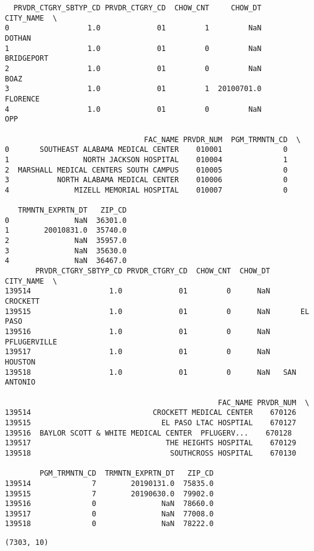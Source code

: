 \documentclass[
  letterpaper,
  DIV=11,
  numbers=noendperiod]{scrartcl}
\begin{document}
\begin{verbatim}
  PRVDR_CTGRY_SBTYP_CD PRVDR_CTGRY_CD  CHOW_CNT     CHOW_DT   CITY_NAME  \
0                  1.0             01         1         NaN      DOTHAN   
1                  1.0             01         0         NaN  BRIDGEPORT   
2                  1.0             01         0         NaN        BOAZ   
3                  1.0             01         1  20100701.0    FLORENCE   
4                  1.0             01         0         NaN         OPP   

                                FAC_NAME PRVDR_NUM  PGM_TRMNTN_CD  \
0       SOUTHEAST ALABAMA MEDICAL CENTER    010001              0   
1                 NORTH JACKSON HOSPITAL    010004              1   
2  MARSHALL MEDICAL CENTERS SOUTH CAMPUS    010005              0   
3           NORTH ALABAMA MEDICAL CENTER    010006              0   
4               MIZELL MEMORIAL HOSPITAL    010007              0   

   TRMNTN_EXPRTN_DT   ZIP_CD  
0               NaN  36301.0  
1        20010831.0  35740.0  
2               NaN  35957.0  
3               NaN  35630.0  
4               NaN  36467.0  
       PRVDR_CTGRY_SBTYP_CD PRVDR_CTGRY_CD  CHOW_CNT  CHOW_DT     CITY_NAME  \
139514                  1.0             01         0      NaN      CROCKETT   
139515                  1.0             01         0      NaN       EL PASO   
139516                  1.0             01         0      NaN  PFLUGERVILLE   
139517                  1.0             01         0      NaN       HOUSTON   
139518                  1.0             01         0      NaN   SAN ANTONIO   

                                                 FAC_NAME PRVDR_NUM  \
139514                            CROCKETT MEDICAL CENTER    670126   
139515                              EL PASO LTAC HOSPTIAL    670127   
139516  BAYLOR SCOTT & WHITE MEDICAL CENTER  PFLUGERV...    670128   
139517                               THE HEIGHTS HOSPITAL    670129   
139518                                SOUTHCROSS HOSPITAL    670130   

        PGM_TRMNTN_CD  TRMNTN_EXPRTN_DT   ZIP_CD  
139514              7        20190131.0  75835.0  
139515              7        20190630.0  79902.0  
139516              0               NaN  78660.0  
139517              0               NaN  77008.0  
139518              0               NaN  78222.0  
\end{verbatim}

\begin{verbatim}
(7303, 10)
\end{verbatim}
\end{document}
